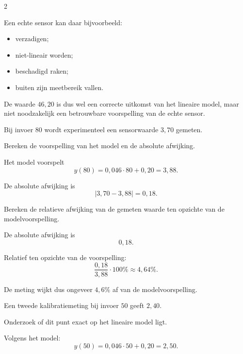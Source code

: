 \documentclass{ximera}
\begin{document}
\begin{oefening}{\oefG}
\begin{multicols}{2}
\begin{question}
\begin{oplossing}
    Een echte sensor kan daar bijvoorbeeld:
    \begin{itemize}
    \item verzadigen;
    \item niet-lineair worden;
    \item beschadigd raken;
    \item buiten zijn meetbereik vallen.
    \end{itemize}
    
    De waarde $46{,}20$ is dus wel een correcte uitkomst van het lineaire model, maar niet noodzakelijk een betrouwbare voorspelling van de echte sensor.
    \end{oplossing}
    \end{question}
    
    
    \begin{question}
    Bij invoer $80$ wordt experimenteel een sensorwaarde $3{,}70$ gemeten.
    
    Bereken de voorspelling van het model en de absolute afwijking.
    
    \begin{oplossing}
    Het model voorspelt
    \[
    y(80)
    =0{,}046\cdot80+0{,}20
    =3{,}88.
    \]
    
    De absolute afwijking is
    \[
    |3{,}70-3{,}88|
    =0{,}18.
    \]
    \end{oplossing}
    \end{question}
    
    
    \begin{question}
    Bereken de relatieve afwijking van de gemeten waarde ten opzichte van de modelvoorspelling.
    
    \begin{oplossing}
    De absolute afwijking is
    \[
    0{,}18.
    \]
    
    Relatief ten opzichte van de voorspelling:
    \[
    \frac{0{,}18}{3{,}88}\cdot100\%
    \approx4{,}64\%.
    \]
    
    De meting wijkt dus ongeveer $4{,}6\%$ af van de modelvoorspelling.
    \end{oplossing}
    \end{question}
    
    
    \begin{question}
    Een tweede kalibratiemeting bij invoer $50$ geeft $2{,}40$.
    
    Onderzoek of dit punt exact op het lineaire model ligt.
    
    \begin{oplossing}
    Volgens het model:
    \[
    y(50)
    =0{,}046\cdot50+0{,}20
    =2{,}50.
    \]
    

\end{oplossing}
\end{question}
\end{multicols}
\end{oefening}
\end{document}
